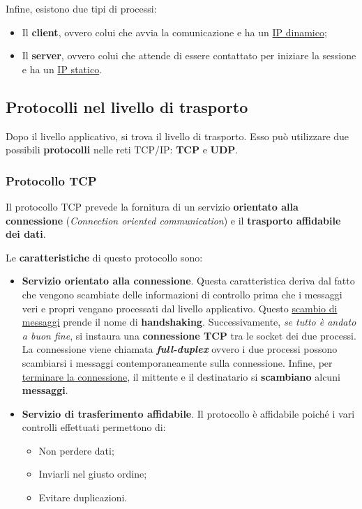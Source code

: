 \documentclass[a4paper]{article}
\begin{document}
	\noindent
	Infine, esistono due tipi di processi:
	
	\begin{itemize}
		\item Il \textbf{client}, ovvero colui che avvia la comunicazione e ha un \underline{IP dinamico};
		\item Il \textbf{server}, ovvero colui che attende di essere contattato per iniziare la sessione e ha un \underline{IP statico}.
	\end{itemize}

	\newpage
	
	\subsection{Protocolli nel livello di trasporto}
	
	Dopo il livello applicativo, si trova il livello di trasporto. Esso può utilizzare due possibili \textbf{protocolli} nelle reti TCP/IP: \textcolor{Red3}{\textbf{TCP}} e \textcolor{Red3}{\textbf{UDP}}.
	
	\subsubsection{Protocollo TCP}
	
	Il protocollo TCP prevede la fornitura di un servizio \textbf{orientato alla connessione} (\emph{Connection oriented communication}) e il \textbf{trasporto affidabile dei dati}.\newline
	
	\noindent
	Le \textbf{caratteristiche} di questo protocollo sono:
	
	\begin{itemize}
		\item \textcolor{Green4}{\textbf{Servizio orientato alla connessione}}. Questa caratteristica deriva dal fatto che vengono scambiate delle informazioni di controllo prima che i messaggi veri e propri vengano processati dal livello applicativo. Questo \underline{scambio di messaggi} prende il nome di \textbf{handshaking}.\newline
		Successivamente, \emph{se tutto è andato a buon fine}, si instaura una \textbf{connessione TCP} tra le socket dei due processi. La connessione viene chiamata \textbf{\emph{full-duplex}} ovvero i due processi possono scambiarsi i messaggi contemporaneamente sulla connessione.
		Infine, per \underline{terminare la connessione}, il mittente e il destinatario si \textbf{scambiano} alcuni \textbf{messaggi}.
		
		\item \textcolor{Green4}{\textbf{Servizio di trasferimento affidabile}}. Il protocollo è affidabile poiché i vari controlli effettuati permettono di:
		\begin{itemize}
			\item Non perdere dati;
			\item Inviarli nel giusto ordine;
			\item Evitare duplicazioni.
		\end{itemize}
	\end{itemize}
	
\end{document}
